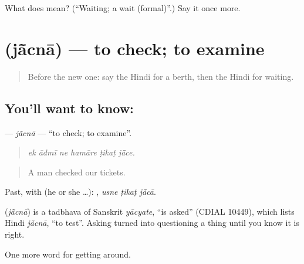 \begin{tcolorbox}[breakable,colback=teal!4,colframe=teal!35!black,title={Before you move on}]
What does  mean? (\textquotedblleft{}Waiting; a wait (formal)\textquotedblright{}.) Say it once more.
\end{tcolorbox}
\section[\texorpdfstring{\hi{जाँचना} (jā̃cnā)}{जाँचना (jā̃cnā)}]{ (jā̃cnā) — to check; to examine}

\label{lesson:HI-C400-jacna}



\begin{quote}
Before the new one: say the Hindi for a berth, then the Hindi for waiting.
\end{quote}

\subsection*{You'll want to know: }
\textbf{} — \emph{jā̃cnā} — \textquotedblleft{}to check; to examine\textquotedblright{}.

\begin{quote}
     
\end{quote}

\begin{quote}
\emph{ek ādmī ne hamāre ṭikaṭ jā̃ce.}
\end{quote}

\begin{quote}
A man checked our tickets.
\end{quote}

Past, with  (he or she …):   , \emph{usne ṭikaṭ jā̃cā}.

\begin{cousinweb}
\textbf{} (\emph{jā̃cnā}) is a tadbhava of Sanskrit \emph{yācyate}, \textquotedblleft{}is asked\textquotedblright{} (CDIAL 10449), which lists Hindi \emph{jā̃cnā}, \textquotedblleft{}to test\textquotedblright{}. Asking turned into questioning a thing until you know it is right.
\end{cousinweb}

\begin{grammarlens}[title={What you've built}]
One more word for getting around.
\end{grammarlens}

